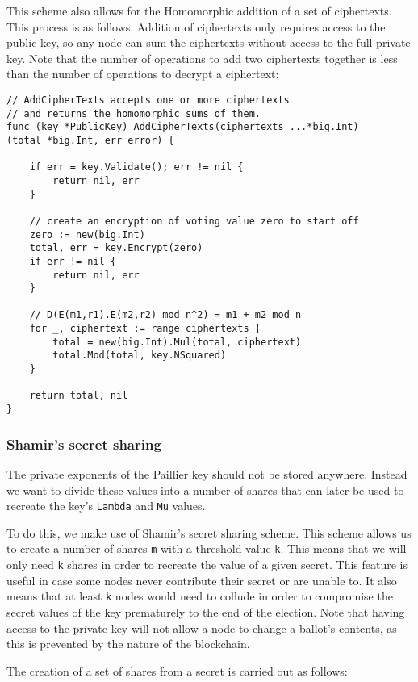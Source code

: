 \documentclass[a4paper,12pt]{article}
\begin{document}
This scheme also allows for the Homomorphic addition of a set of ciphertexts. This process is as follows. Addition of ciphertexts only requires access to the public key, so any node can sum the ciphertexts without access to the full private key. Note that the number of operations to add two ciphertexts together is less than the number of operations to decrypt a ciphertext:

\begin{Verbatim}[obeytabs,tabsize=4]
// AddCipherTexts accepts one or more ciphertexts
// and returns the homomorphic sums of them.
func (key *PublicKey) AddCipherTexts(ciphertexts ...*big.Int)
(total *big.Int, err error) {

	if err = key.Validate(); err != nil {
		return nil, err
	}

	// create an encryption of voting value zero to start off
	zero := new(big.Int)
	total, err = key.Encrypt(zero)
	if err != nil {
		return nil, err
	}

	// D(E(m1,r1).E(m2,r2) mod n^2) = m1 + m2 mod n
	for _, ciphertext := range ciphertexts {
		total = new(big.Int).Mul(total, ciphertext)
		total.Mod(total, key.NSquared)
	}

	return total, nil
}
\end{Verbatim}

\subsubsection{Shamir's secret sharing}
The private exponents of the Paillier key should not be stored anywhere. Instead we want to divide these values into a number of shares that can later be used to recreate the key's \verb|Lambda| and \verb|Mu| values.

To do this, we make use of Shamir's secret sharing scheme. This scheme allows us to create a number of shares \verb|m| with a threshold value \verb|k|. This means that we will only need \verb|k| shares in order to recreate the value of a given secret. This feature is useful in case some nodes never contribute their secret or are unable to. It also means that at least \verb|k| nodes would need to collude in order to compromise the secret values of the key prematurely to the end of the election. Note that having access to the private key will not allow a node to change a ballot's contents, as this is prevented by the nature of the blockchain.

The creation of a set of shares from a secret is carried out as follows:
\end{document}
